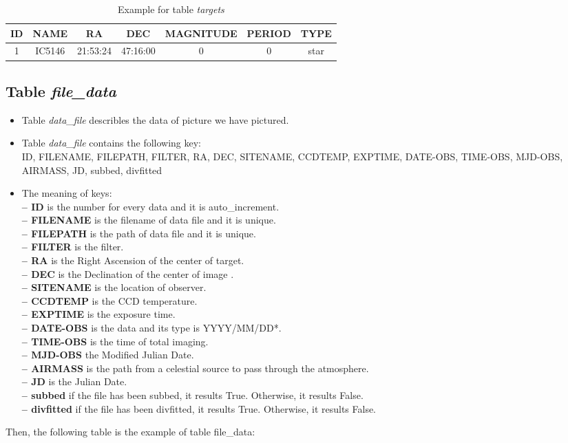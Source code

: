 \documentclass[12pt]{article}    %
\begin{document}
	\begin{table}[!htbp]
		\centering
		\caption{Example for table {\it targets}}
		\begin{tabular}{|*{7}{c|}}
			\hline
			ID & NAME & RA & DEC & MAGNITUDE & PERIOD & TYPE  \\ \hline
			1 & IC5146 & 21:53:24 & 47:16:00 & 0 & 0 & star \\ \hline
		\end{tabular}
	\end{table}

	\subsection{Table \it {file\_data}}
	\begin{itemize}
		\item Table {\it data\_file} describles the data of picture we have pictured.
		\item Table {\it data\_file} contains the following key:\\
		\footnotesize
		\indent ID, FILENAME, FILEPATH, FILTER, RA, DEC, SITENAME, CCDTEMP, EXPTIME, DATE-OBS, TIME-OBS, MJD-OBS, AIRMASS, JD, subbed, divfitted
		\normalsize
		\item The meaning of keys:\\[0.2cm]
		\textbf {-- ID} is the number for every data and it is auto\_increment.\\
		\textbf {-- FILENAME} is the filename of data file and it is unique.\\
		\textbf {-- FILEPATH} is the path of data file and it is unique.\\
		\textbf {-- FILTER} is the filter.\\
		\textbf {-- RA} is the Right Ascension of the center of target.\\
		\textbf {-- DEC} is the Declination of the center of image .\\
		\textbf {-- SITENAME} is the location of observer.\\
		\textbf {-- CCDTEMP} is the CCD temperature.\\
		\textbf {-- EXPTIME} is the exposure time.\\
		\textbf {-- DATE-OBS} is the data and its type is YYYY/MM/DD*.\\
		\textbf {-- TIME-OBS} is the time of total imaging.\\
		\textbf {-- MJD-OBS} the Modified Julian Date.\\
		\textbf {-- AIRMASS} is the path from a celestial source to pass through the atmosphere.\\
		\textbf {-- JD} is the Julian Date.\\
		\textbf {-- subbed} if the file has been subbed, it results True. Otherwise, it results False.\\
		\textbf {-- divfitted} if the file has been divfitted, it results True. Otherwise, it results False.\\


	\end{itemize}
	Then, the following table is the example of table file\_data:
	
\end{document}
